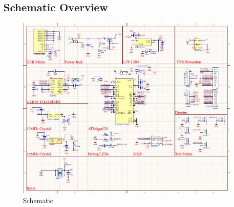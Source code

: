 \documentclass[a4paper,11pt]{article}%
\begin{document}
\subsection{Schematic Overview}


\begin{figure}[H]
	\centering
	\includegraphics[scale=0.5]{figures/schematic.png}
	\caption{Schematic}
\end{figure}
\end{document}
